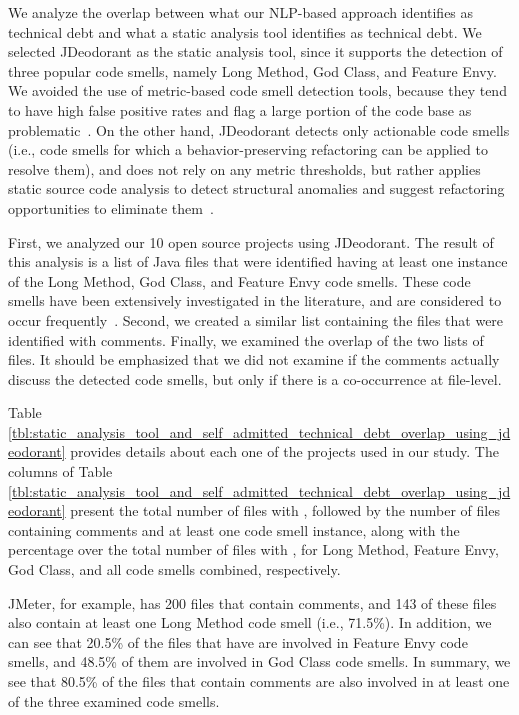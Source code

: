 We analyze the overlap between what our NLP-based approach identifies as technical debt and what a static analysis tool identifies as technical debt. We selected JDeodorant as the static analysis tool, since it supports the detection of three popular code smells, namely Long Method, God Class, and Feature Envy. We avoided the use of metric-based code smell detection tools, because they tend to have high false positive rates and flag a large portion of the code base as problematic~\cite{Fontana2016SANER}. On the other hand, JDeodorant detects only actionable code smells (i.e., code smells for which a behavior-preserving refactoring can be applied to resolve them), and does not rely on any metric thresholds, but rather applies static source code analysis to detect structural anomalies and suggest refactoring opportunities to eliminate them~\cite{Tsantalis2008CSMR}.

First, we analyzed our 10 open source projects using JDeodorant. The result of this analysis is a list of Java files that were identified having at least one instance of
the Long Method, God Class, and Feature Envy code smells. These code smells have been extensively investigated in the literature, and are considered to occur frequently~\cite{Olbrich2010ICSM,Sjoberg2013TSE}. Second, we created a similar list containing the files that were identified with \SATD comments. Finally, we examined the overlap of the two lists of files. It should be emphasized that we did not examine if the \SATD comments actually discuss the detected code smells, but only if there is a co-occurrence at file-level.

Table \ref{tbl:static_analysis_tool_and_self_admitted_technical_debt_overlap_using_jdeodorant} provides details about each one of the projects used in our study. The columns of Table \ref{tbl:static_analysis_tool_and_self_admitted_technical_debt_overlap_using_jdeodorant} present the total number of files with \SATD, followed by the number of files containing \SATD comments and at least one code smell instance,
along with the percentage over the total number of files with \SATD, for Long Method, Feature Envy, God Class, and all code smells combined, respectively. 

JMeter, for example, has 200 files that contain \SATD comments, and 143 of these files also contain at least one Long Method code smell (i.e., 71.5\%). In addition, we can see that 20.5\% of the files that have \SATD are involved in Feature Envy code smells, and 48.5\% of them are involved in God Class code smells. In summary, we see that 80.5\% of the files that contain \SATD comments are also involved in at least one of the three examined code smells.     

